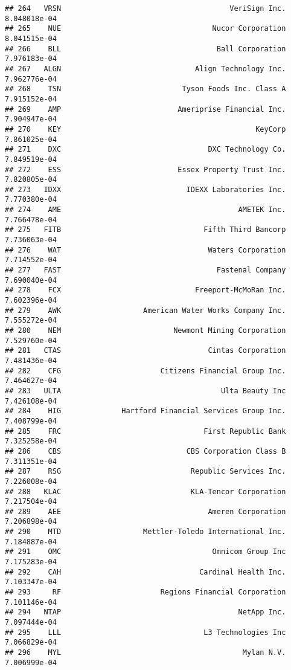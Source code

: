 \documentclass[
]{article}
\begin{document}
\begin{verbatim}
## 264   VRSN                                       VeriSign Inc. 8.048018e-04
## 265    NUE                                   Nucor Corporation 8.041515e-04
## 266    BLL                                    Ball Corporation 7.976183e-04
## 267   ALGN                               Align Technology Inc. 7.962776e-04
## 268    TSN                            Tyson Foods Inc. Class A 7.915152e-04
## 269    AMP                           Ameriprise Financial Inc. 7.904947e-04
## 270    KEY                                             KeyCorp 7.861025e-04
## 271    DXC                                  DXC Technology Co. 7.849519e-04
## 272    ESS                           Essex Property Trust Inc. 7.820805e-04
## 273   IDXX                             IDEXX Laboratories Inc. 7.770380e-04
## 274    AME                                         AMETEK Inc. 7.766478e-04
## 275   FITB                                 Fifth Third Bancorp 7.736063e-04
## 276    WAT                                  Waters Corporation 7.714552e-04
## 277   FAST                                    Fastenal Company 7.690040e-04
## 278    FCX                               Freeport-McMoRan Inc. 7.602396e-04
## 279    AWK                   American Water Works Company Inc. 7.555272e-04
## 280    NEM                          Newmont Mining Corporation 7.529760e-04
## 281   CTAS                                  Cintas Corporation 7.481436e-04
## 282    CFG                       Citizens Financial Group Inc. 7.464627e-04
## 283   ULTA                                     Ulta Beauty Inc 7.426108e-04
## 284    HIG              Hartford Financial Services Group Inc. 7.408799e-04
## 285    FRC                                 First Republic Bank 7.325258e-04
## 286    CBS                             CBS Corporation Class B 7.311351e-04
## 287    RSG                              Republic Services Inc. 7.226008e-04
## 288   KLAC                              KLA-Tencor Corporation 7.217504e-04
## 289    AEE                                  Ameren Corporation 7.206898e-04
## 290    MTD                   Mettler-Toledo International Inc. 7.184887e-04
## 291    OMC                                   Omnicom Group Inc 7.175283e-04
## 292    CAH                                Cardinal Health Inc. 7.103347e-04
## 293     RF                       Regions Financial Corporation 7.101146e-04
## 294   NTAP                                         NetApp Inc. 7.097444e-04
## 295    LLL                                 L3 Technologies Inc 7.066829e-04
## 296    MYL                                          Mylan N.V. 7.006999e-04

\end{verbatim}
\end{document}
